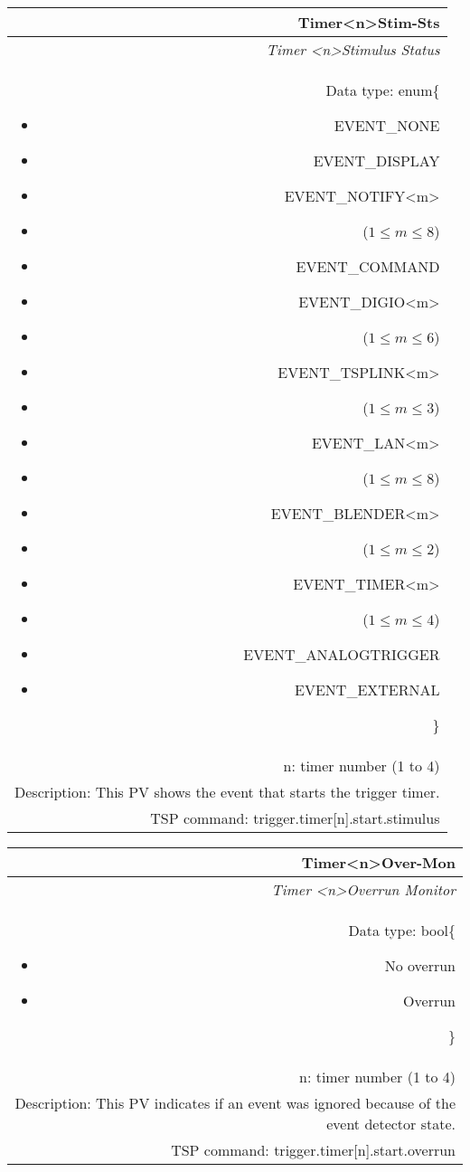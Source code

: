 \documentclass[openany]{article}
\begin{document}
		\begin{tabular}{N}
			\hline
			\bfseries Timer{\textless n\textgreater}Stim-Sts\label{pv:timerstim-sts} \\ \hline
			\emph{Timer \textless n\textgreater Stimulus Status} \\
			Data type: enum\{\begin{itemize}[noitemsep]
				\small
				\item[] EVENT\_NONE
				\item[] EVENT\_DISPLAY
				\item[] EVENT\_NOTIFY\textless m\textgreater
				\item[] ($1\leq m\leq 8$)
				\item[] EVENT\_COMMAND
				\item[] EVENT\_DIGIO\textless m\textgreater
				\item[] ($1\leq m\leq 6$)
				\item[] EVENT\_TSPLINK\textless m\textgreater
				\item[] ($1\leq m\leq 3$)
				\item[] EVENT\_LAN\textless m\textgreater
				\item[] ($1\leq m\leq 8$)
				\item[] EVENT\_BLENDER\textless m\textgreater 
				\item[] ($1\leq m\leq 2$)
				\item[] EVENT\_TIMER\textless m\textgreater
				\item[] ($1\leq m\leq 4$)
				\item[] EVENT\_ANALOGTRIGGER
				\item[] EVENT\_EXTERNAL
			\end{itemize}\} \\
			n: timer number (1 to 4) \\
			Description: This PV shows the event that starts the trigger timer. \\
			TSP command: trigger.timer[n].start.stimulus
		\end{tabular}

		\begin{tabular}{N}
			\hline
			\bfseries Timer{\textless n\textgreater}Over-Mon\label{pv:timerover-mon} \\ \hline
			\emph{Timer \textless n\textgreater Overrun Monitor} \\
			Data type: bool\{\begin{itemize}[noitemsep]
				\small
				\item[] No overrun
				\item[] Overrun
			\end{itemize}\} \\
			n: timer number (1 to 4) \\
			Description: This PV indicates if an event was ignored because of the event detector state. \\
			TSP command: trigger.timer[n].start.overrun
		\end{tabular}
\end{document}
